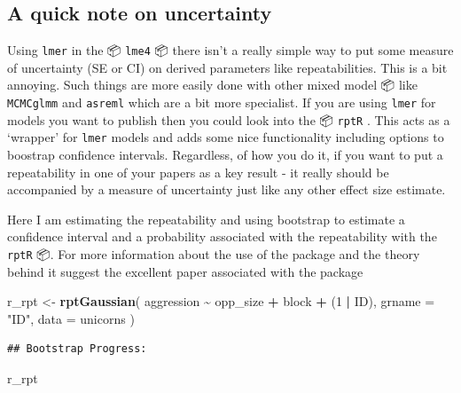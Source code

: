 \documentclass[
  12pt,
]{book}
\newenvironment{Shaded}{\begin{snugshade}}{\end{snugshade}}
\newcommand{\DataTypeTok}[1]{\textcolor[rgb]{0.13,0.29,0.53}{#1}}
\newcommand{\DecValTok}[1]{\textcolor[rgb]{0.00,0.00,0.81}{#1}}
\newcommand{\KeywordTok}[1]{\textcolor[rgb]{0.13,0.29,0.53}{\textbf{#1}}}
\newcommand{\NormalTok}[1]{#1}
\newcommand{\OperatorTok}[1]{\textcolor[rgb]{0.81,0.36,0.00}{\textbf{#1}}}
\newcommand{\StringTok}[1]{\textcolor[rgb]{0.31,0.60,0.02}{#1}}
\begin{document}
\hypertarget{a-quick-note-on-uncertainty}{%
\subsection{A quick note on uncertainty}\label{a-quick-note-on-uncertainty}}

Using \texttt{lmer} in the 📦 \texttt{lme4} 📦 there isn't a really simple way to put some measure of uncertainty (SE or CI) on derived parameters like repeatabilities. This is a bit annoying. Such things are more easily done with other mixed model 📦 like \texttt{MCMCglmm} and \texttt{asreml} which are a bit more specialist. If you are using \texttt{lmer} for models you want to publish then you could look into the 📦 \texttt{rptR} \citep{R-rptR}. This acts as a `wrapper' for \texttt{lmer} models and adds some nice functionality including options to boostrap confidence intervals. Regardless, of how you do it, if you want to put a repeatability in one of your papers as a key result - it really should be accompanied by a measure of uncertainty just like any other effect size estimate.

Here I am estimating the repeatability and using bootstrap to estimate a confidence interval and a probability associated with the repeatability with the \texttt{rptR} 📦. For more information about the use of the package and the theory behind it suggest the excellent paper associated with the package \citep{rptR2017}

\begin{Shaded}
\begin{Highlighting}[]
\NormalTok{r\_rpt \textless{}{-}}\StringTok{ }\KeywordTok{rptGaussian}\NormalTok{(}
\NormalTok{  aggression }\OperatorTok{\textasciitilde{}}\StringTok{ }\NormalTok{opp\_size }\OperatorTok{+}\StringTok{ }\NormalTok{block }\OperatorTok{+}\StringTok{ }\NormalTok{(}\DecValTok{1} \OperatorTok{|}\StringTok{ }\NormalTok{ID),}
  \DataTypeTok{grname =} \StringTok{"ID"}\NormalTok{, }\DataTypeTok{data =}\NormalTok{ unicorns}
\NormalTok{)}
\end{Highlighting}
\end{Shaded}

\begin{verbatim}
## Bootstrap Progress:
\end{verbatim}

\begin{Shaded}
\begin{Highlighting}[]
\NormalTok{r\_rpt}
\end{Highlighting}
\end{Shaded}
\end{document}
